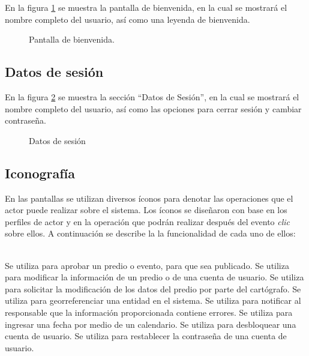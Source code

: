 En la figura \ref{fig:inicio} se muestra la pantalla de bienvenida, en la cual se mostrará el nombre completo del usuario, así como una leyenda de bienvenida.
\begin{figure}[htbp!]
    \begin{center}
	\caption{Pantalla de bienvenida.}
	\label{fig:inicio}
    \end{center}
\end{figure}

\subsection{Datos de sesión}
\label{ch:Interaccion:DatosSesion}

En la figura \ref{fig:sesion} se muestra la sección ``Datos de Sesión'', en la cual se mostrará el nombre completo del usuario, así como las opciones para cerrar sesión y cambiar contraseña.
\begin{figure}[htbp!]
    \begin{center}
	\caption{Datos de sesión}
	\label{fig:sesion}
    \end{center}
\end{figure}

\subsection{Iconografía}

  En las pantallas se utilizan diversos íconos para denotar las operaciones que el actor puede realizar sobre el sistema. Los íconos se diseñaron con base en los perfiles de actor y en la operación que podrán realizar 
  después del evento {\it clic} sobre ellos.  A continuación se describe la la funcionalidad de cada uno de ellos:\\\\

  \begin{UClist}
    \UCli \botOk Se utiliza para aprobar un predio o evento, para que sea publicado.
    \UCli \botEdit Se utiliza para modificar la información de un predio o de una cuenta de usuario.
    \UCli \botReg Se utiliza para solicitar la modificación de los datos del predio por parte del cartógrafo.
    \UCli \botGeoref Se utiliza para georreferenciar una entidad en el sistema.
    \UCli \botErrorInfo Se utiliza para notificar al responsable que la información proporcionada contiene errores.
    \UCli \botCalendar Se utiliza para ingresar una fecha por medio de un calendario.
    \UCli \botLock Se utiliza para desbloquear una cuenta de usuario.
    \UCli \botReestCont Se utiliza para restablecer la contraseña de una cuenta de usuario. 
  \end{UClist}

